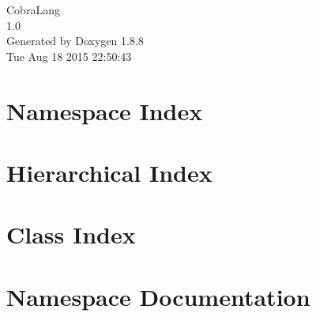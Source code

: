 \documentclass[twoside]{book}
\newcommand{\+}{\discretionary{\mbox{\scriptsize$\hookleftarrow$}}{}{}}
\newcommand{\clearemptydoublepage}{%
  \newpage{\pagestyle{empty}\cleardoublepage}%
}
\begin{document}
\hypersetup{pageanchor=false,
             bookmarks=true,
             bookmarksnumbered=true,
             pdfencoding=unicode
            }
\begin{titlepage}
\vspace*{7cm}
\begin{center}%
{\Large Cobra\+Lang \\[1ex]\large 1.\+0 }\\
\vspace*{1cm}
{\large Generated by Doxygen 1.8.8}\\
\vspace*{0.5cm}
{\small Tue Aug 18 2015 22:50:43}\\
\end{center}
\end{titlepage}
\clearemptydoublepage
\tableofcontents
\clearemptydoublepage
{}
\hypersetup{pageanchor=true}

\chapter{Namespace Index}

\chapter{Hierarchical Index}

\chapter{Class Index}

\chapter{Namespace Documentation}

\end{document}
